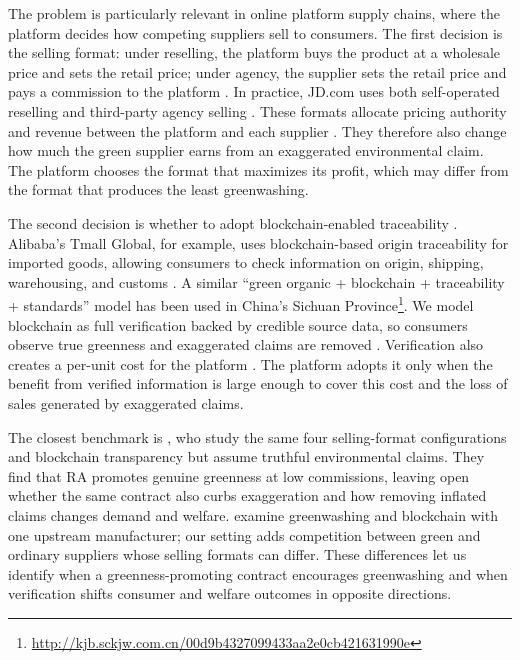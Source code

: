 \documentclass[preprint,review,12pt,authoryear,nopreprintline]{elsarticle}
\theoremstyle{definition}
\begin{document}
The problem is particularly relevant in online platform supply chains, where the platform decides how competing suppliers sell to consumers. The first decision is the selling format: under reselling, the platform buys the product at a wholesale price and sets the retail price; under agency, the supplier sets the retail price and pays a commission to the platform \citep{Abhishek2016, tian2018mark}. In practice, JD.com uses both self-operated reselling and third-party agency selling \citep{yuan2025re, zhao2024sales}. These formats allocate pricing authority and revenue between the platform and each supplier \citep{wu2025platform,wuZhao2027cooperative}. They therefore also change how much the green supplier earns from an exaggerated environmental claim. The platform chooses the format that maximizes its profit, which may differ from the format that produces the least greenwashing.

The second decision is whether to adopt blockchain-enabled traceability \citep{xu2025should, wu2025platform}. Alibaba's Tmall Global, for example, uses blockchain-based origin traceability for imported goods, allowing consumers to check information on origin, shipping, warehousing, and customs \citep{cao2022adopt}. A similar ``green organic + blockchain + traceability + standards'' model has been used in China's Sichuan Province\footnote{\url{http://kjb.sckjw.com.cn/00d9b4327099433aa2e0cb421631990e}}. We model blockchain as full verification backed by credible source data, so consumers observe true greenness and exaggerated claims are removed \citep{shen2022combat, wu2024blockchain}. Verification also creates a per-unit cost for the platform \citep{dong2023log, wu2025platform}. The platform adopts it only when the benefit from verified information is large enough to cover this cost and the loss of sales generated by exaggerated claims.

The closest benchmark is \citet{wu2025platform}, who study the same four selling-format configurations and blockchain transparency but assume truthful environmental claims. They find that RA promotes genuine greenness at low commissions, leaving open whether the same contract also curbs exaggeration and how removing inflated claims changes demand and welfare. \citet{xu2025should} examine greenwashing and blockchain with one upstream manufacturer; our setting adds competition between green and ordinary suppliers whose selling formats can differ. These differences let us identify when a greenness-promoting contract encourages greenwashing and when verification shifts consumer and welfare outcomes in opposite directions.
\end{document}
